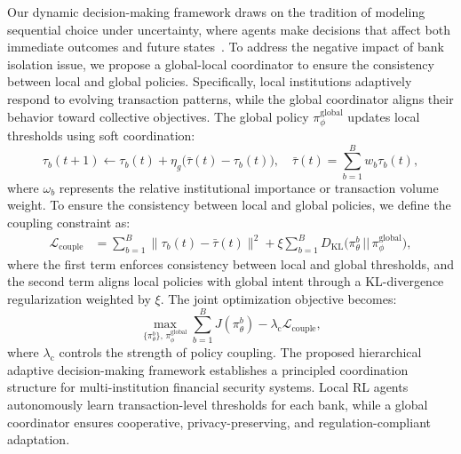 Our dynamic decision-making framework draws on the tradition of modeling sequential choice under uncertainty, where agents make decisions that affect both immediate outcomes and future states~\parencite{mehta2017ni}. To address the negative impact of bank isolation issue, we propose a global-local coordinator to ensure the consistency between local and global policies. Specifically, local institutions adaptively respond to evolving transaction patterns, while the global coordinator aligns their behavior toward collective objectives. The global policy $\pi_\phi^{\text{global}}$ updates local thresholds using soft coordination:
\begin{equation}
    \tau_b(t+1) \leftarrow \tau_b(t) + \eta_g \big(\bar{\tau}(t) - \tau_b(t)\big), \quad 
    \bar{\tau}(t) = \sum_{b=1}^{B} w_b \tau_b(t), 
\end{equation}
where $\omega_b$ represents the relative institutional importance or transaction volume weight. To ensure the consistency between local and global policies, we define the coupling constraint as:
\begin{align}
    \mathcal{L}_{\text{couple}} &= 
    \sum_{b=1}^B \big\| \tau_b(t) - \bar{\tau}(t) \big\|^2
    + \xi \sum_{b=1}^B D_{\mathrm{KL}}\!\big(\pi_\theta^b \,||\, \pi_\phi^{\text{global}}\big), 
\end{align}
where the first term enforces consistency between local and global thresholds, and the second term aligns local policies with global intent through a KL-divergence regularization weighted by $\xi$. 
The joint optimization objective becomes:
\begin{equation}
    \max_{\{\pi_\theta^b\},\, \pi_\phi^{\text{global}}}
    \sum_{b=1}^B J(\pi_\theta^b)
    - \lambda_{\text{c}} \mathcal{L}_{\text{couple}},
\end{equation}
where $\lambda_{\text{c}}$ controls the strength of policy coupling.
The proposed hierarchical adaptive decision-making framework establishes a principled coordination structure for multi-institution financial security systems. Local RL agents autonomously learn transaction-level thresholds for each bank, while a global coordinator ensures cooperative, privacy-preserving, and regulation-compliant adaptation.  

